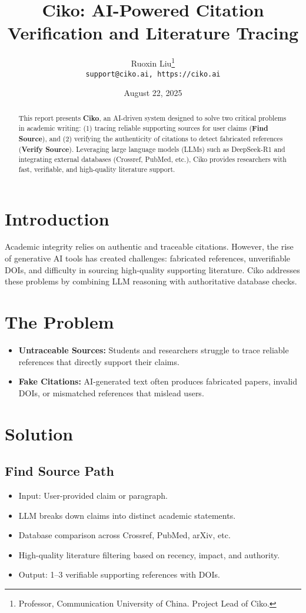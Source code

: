 \documentclass{article}
\title{Ciko: AI-Powered Citation Verification and Literature Tracing}
\author{
  Ruoxin Liu\thanks{Professor, Communication University of China. Project Lead of Ciko.} \\
  \texttt{support@ciko.ai, https://ciko.ai}
}
\date{August 22, 2025}
\begin{document}
\maketitle

\begin{abstract}
This report presents \textbf{Ciko}, an AI-driven system designed to solve two critical problems in academic writing: (1) tracing reliable supporting sources for user claims (\textbf{Find Source}), and (2) verifying the authenticity of citations to detect fabricated references (\textbf{Verify Source}). Leveraging large language models (LLMs) such as DeepSeek-R1 and integrating external databases (Crossref, PubMed, etc.), Ciko provides researchers with fast, verifiable, and high-quality literature support.
\end{abstract}

\section{Introduction}
Academic integrity relies on authentic and traceable citations. However, the rise of generative AI tools has created challenges: fabricated references, unverifiable DOIs, and difficulty in sourcing high-quality supporting literature. Ciko addresses these problems by combining LLM reasoning with authoritative database checks.

\section{The Problem}
\begin{itemize}
    \item \textbf{Untraceable Sources:} Students and researchers struggle to trace reliable references that directly support their claims.
    \item \textbf{Fake Citations:} AI-generated text often produces fabricated papers, invalid DOIs, or mismatched references that mislead users.
\end{itemize}

\section{Solution}
\subsection{Find Source Path}
\begin{itemize}
    \item Input: User-provided claim or paragraph.
    \item LLM breaks down claims into distinct academic statements.
    \item Database comparison across Crossref, PubMed, arXiv, etc.
    \item High-quality literature filtering based on recency, impact, and authority.
    \item Output: 1--3 verifiable supporting references with DOIs.
\end{itemize}
\end{document}
